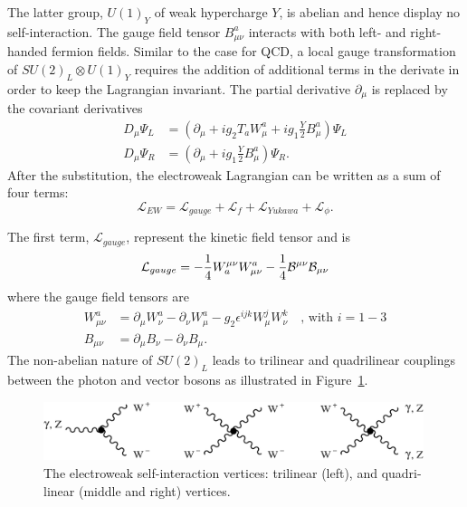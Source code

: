 The latter group, $U(1)_Y$ of weak hypercharge $Y$, is abelian and hence display no self-interaction. The gauge field tensor $B_{\mu\nu}^a$ interacts with both left- and right-handed fermion fields. Similar to the case for QCD, a local gauge transformation of $SU (2)_L \otimes U(1)_Y$ requires the addition of additional terms in the derivate in order to keep the Lagrangian invariant. The partial derivative $\partial_{\mu}$ is replaced by the covariant derivatives
\begin{align}
  \label{eq:theory:ewcov}
  D_\mu \Psi_L &=(\partial_{\mu} + ig_2 T_a W_{\mu}^a + ig_1 \frac{Y}{2} B_{\mu}^a)\Psi_L\\
  D_\mu \Psi_R &=(\partial_{\mu} + ig_1 \frac{Y}{2} B_{\mu}^a)\Psi_R.
\end{align}
After the substitution, the electroweak Lagrangian can be written as a sum of four terms:
\begin{equation}
  \label{eq:theory:ewl}
   \mathcal{L}_{EW} = \mathcal{L}_{gauge}+\mathcal{L}_{f}+\mathcal{L}_{Yukawa}+\mathcal{L}_{\phi}.
\end{equation}
\par The first term, $\mathcal{L}_{gauge}$, represent the kinetic field tensor and is
\begin{equation}
  \label{eq:theory:gauge}
   \mathcal{L}_{gauge} = -\frac{1}{4}W_{a}^{\mu\nu}W^{a}_{\mu\nu} - \frac{1}{4}{\cal B}^{\mu\nu}{\cal B}_{\mu\nu}
\end{equation}
where the gauge field tensors are
\begin{align}
W_{\mu\nu}^a &=\partial_{\mu} W_{\nu}^a-\partial_{\nu} W_{\mu}^a-g_2\epsilon^{ijk}W^{j}_{\mu}W^{k}_{\nu} \quad \textrm{, with   } i=1-3\\
B_{\mu\nu} &=\partial_{\mu} B_{\nu}-\partial_{\nu} B_{\mu}.
\end{align}
The non-abelian nature of $SU (2)_L$ leads to trilinear and quadrilinear couplings between the photon and vector bosons as illustrated in Figure~\ref{fig:theory:weakint}.
\begin{figure}[h!]
\centering
\includegraphics[width=0.99\textwidth]{figures/theory/weak_selfinteraction.png}
\caption{The electroweak self-interaction vertices: trilinear (left), and quadri-linear (middle and right) vertices.}
\label{fig:theory:weakint}
\end{figure}
